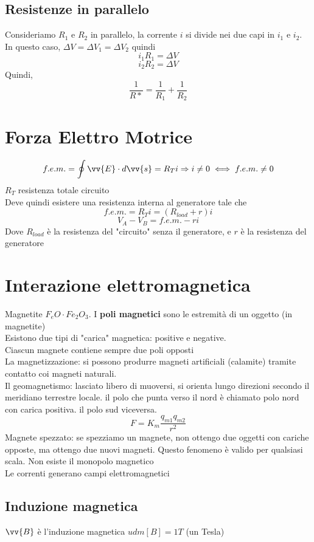 \documentclass[a4paper]{report}
\begin{document}
  \subsection{Resistenze in parallelo}
  Consideriamo $R_1$ e $R_2$ in parallelo, la corrente $i$ si divide nei due capi in $i_1$ e $i_2$. In questo caso, $\Delta V = \Delta V_1 = \Delta V_2$ quindi
  $$ i_1 R_1 = \Delta V $$
  $$ i_2 R_2 = \Delta V $$
  Quindi,
  $$ \frac{1}{R*} = \frac{1}{R_1} + \frac{1}{R_2} $$

  \section{Forza Elettro Motrice}
  $$ f.e.m. = \oint \vv{E} \cdot d\vv{s} = R_T i \Rightarrow i \neq 0 \iff f.e.m. \neq 0$$
  $R_T$ resistenza totale circuito\\
  Deve quindi esistere una resistenza interna al generatore tale che
  $$ f.e.m. = R_T i = (R_{load} + r)i $$
  $$ V_A - V_B = f.e.m. -ri $$
  Dove $R_{load}$ è la resistenza del "circuito" senza il generatore, e $r$ è la resistenza del generatore

  \section{Interazione elettromagnetica}
  Magnetite $F_eO \cdot Fe_2O_3$. I \textbf{poli magnetici} sono le estremità di un oggetto (in magnetite)\\
  Esistono due tipi di "carica" magnetica: positive e negative.\\
  Ciascun magnete contiene sempre due poli opposti\\
  La magnetizzazione: si possono produrre magneti artificiali (calamite) tramite contatto coi magneti naturali.\\
  Il geomagnetismo: lasciato libero di muoversi, si orienta lungo direzioni secondo il meridiano terrestre locale. il polo che punta verso il nord è chiamato polo nord con carica positiva. il polo sud viceversa.\\
  $$F = K_m \frac{q_{m1}q_{m2}}{r^2}$$
  Magnete spezzato: se spezziamo un magnete, non ottengo due oggetti con cariche opposte, ma ottengo due nuovi magneti. Questo fenomeno è valido per qualsiasi scala. Non esiste il monopolo magnetico\\
  Le correnti generano campi elettromagnetici
  \subsection{Induzione magnetica}
  $\vv{B}$ è l'induzione magnetica $udm[B] = 1T$ (un Tesla)
\end{document}
